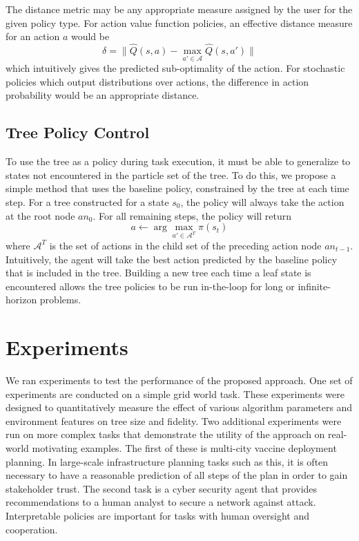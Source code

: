 \documentclass[letterpaper]{article} %
\begin{document}
The distance metric may be any appropriate measure assigned by the user for the given policy type.
For action value function policies, an effective distance measure for an action $a$ would be
\begin{equation}\label{eq: delta dqn}
\delta = \| \hat{Q}(s, a) - \max_{a' \in \mathcal{A}} \hat{Q}(s, a') \|
\end{equation}
which intuitively gives the predicted sub-optimality of the action.
For stochastic policies which output distributions over actions, the difference in action probability would be an appropriate distance.

\subsection{Tree Policy Control}\label{sec: tree execution}
To use the tree as a policy during task execution, it must be able to generalize to states not encountered in the particle set of the tree.
To do this, we propose a simple method that uses the baseline policy, constrained by the tree at each time step.
For a tree constructed for a state $s_0$, the policy will always take the action at the root node $an_0$.
For all remaining steps, the policy will return
\begin{equation}
a \gets \arg\max_{a' \in \mathcal{A}^T} \pi(s_t)
\end{equation}
where $\mathcal{A}^T$ is the set of actions in the child set of the preceding action node $an_{t-1}$.
Intuitively, the agent will take the best action predicted by the baseline policy that is included in the tree.
Building a new tree each time a leaf state is encountered allows the tree policies to be run in-the-loop for long or infinite-horizon problems.

\section{Experiments}
We ran experiments to test the performance of the proposed approach.
One set of experiments are conducted on a simple grid world task.
These experiments were designed to quantitatively measure the effect of various algorithm parameters and environment features on tree size and fidelity.
Two additional experiments were run on more complex tasks that demonstrate the utility of the approach on real-world motivating examples.
The first of these is multi-city vaccine deployment planning.
In large-scale infrastructure planning tasks such as this, it is often necessary to have a reasonable prediction of all steps of the plan in order to gain stakeholder trust.
The second task is a cyber security agent that provides recommendations to a human analyst to secure a network against attack.
Interpretable policies are important for tasks with human oversight and cooperation.
\end{document}
